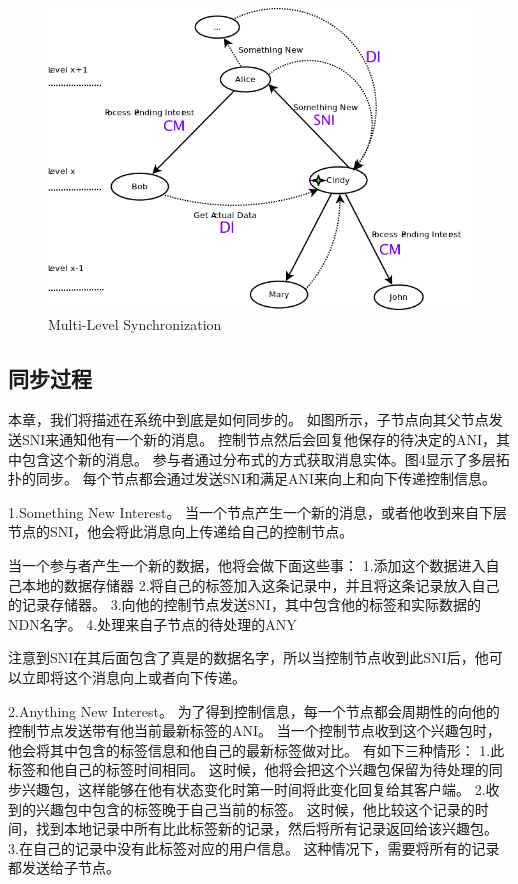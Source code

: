\documentclass[a4paper]{article}
\begin{document}
\begin{figure}[!t]
\centering
\includegraphics[width=4.5in]{../png/tree-synchronization.png}
\caption{Multi-Level Synchronization}
\label{tree_synchronization}
\end{figure}

\subsection{同步过程}

本章，我们将描述在系统中到底是如何同步的。
如图所示，子节点向其父节点发送SNI来通知他有一个新的消息。
控制节点然后会回复他保存的待决定的ANI，其中包含这个新的消息。
参与者通过分布式的方式获取消息实体。图4显示了多层拓扑的同步。
每个节点都会通过发送SNI和满足ANI来向上和向下传递控制信息。

1.Something New Interest。
当一个节点产生一个新的消息，或者他收到来自下层节点的SNI，他会将此消息向上传递给自己的控制节点。

当一个参与者产生一个新的数据，他将会做下面这些事：
1.添加这个数据进入自己本地的数据存储器
2.将自己的标签加入这条记录中，并且将这条记录放入自己的记录存储器。
3.向他的控制节点发送SNI，其中包含他的标签和实际数据的NDN名字。
4.处理来自子节点的待处理的ANY

注意到SNI在其后面包含了真是的数据名字，所以当控制节点收到此SNI后，他可以立即将这个消息向上或者向下传递。

2.Anything New Interest。
为了得到控制信息，每一个节点都会周期性的向他的控制节点发送带有他当前最新标签的ANI。
当一个控制节点收到这个兴趣包时，他会将其中包含的标签信息和他自己的最新标签做对比。
有如下三种情形：
1.此标签和他自己的标签时间相同。
这时候，他将会把这个兴趣包保留为待处理的同步兴趣包，这样能够在他有状态变化时第一时间将此变化回复给其客户端。
2.收到的兴趣包中包含的标签晚于自己当前的标签。
这时候，他比较这个记录的时间，找到本地记录中所有比此标签新的记录，然后将所有记录返回给该兴趣包。
3.在自己的记录中没有此标签对应的用户信息。
这种情况下，需要将所有的记录都发送给子节点。
\end{document}
